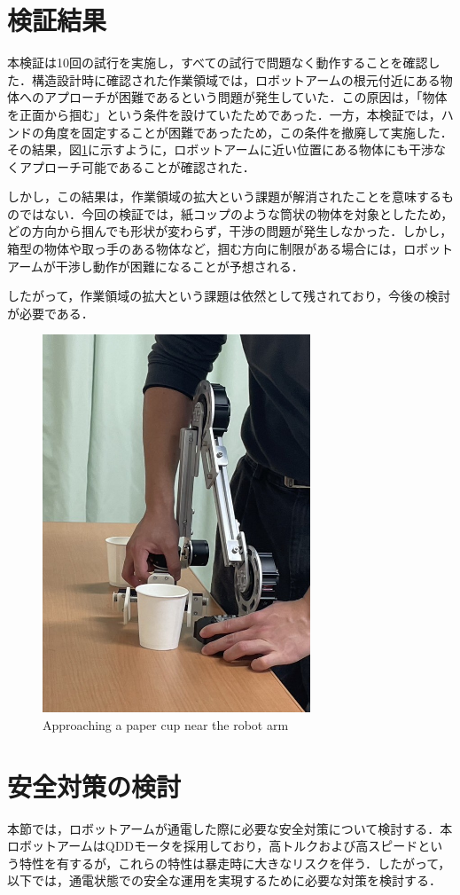 \section{検証結果}
本検証は10回の試行を実施し，すべての試行で問題なく動作することを確認した．構造設計時に確認された作業領域では，ロボットアームの根元付近にある物体へのアプローチが困難であるという問題が発生していた．この原因は，「物体を正面から掴む」という条件を設けていたためであった．一方，本検証では，ハンドの角度を固定することが困難であったため，この条件を撤廃して実施した．その結果，図\ref{fig:tikai}に示すように，ロボットアームに近い位置にある物体にも干渉なくアプローチ可能であることが確認された．

しかし，この結果は，作業領域の拡大という課題が解消されたことを意味するものではない．今回の検証では，紙コップのような筒状の物体を対象としたため，どの方向から掴んでも形状が変わらず，干渉の問題が発生しなかった．しかし，箱型の物体や取っ手のある物体など，掴む方向に制限がある場合には，ロボットアームが干渉し動作が困難になることが予想される．

したがって，作業領域の拡大という課題は依然として残されており，今後の検討が必要である．
\begin{figure}
  \centering
  \includegraphics[width=8cm]{images/kensyo/tikai.jpg}
  \caption{Approaching a paper cup near the robot arm}
  \label{fig:tikai}
\end{figure}
\newpage

\section{安全対策の検討}
本節では，ロボットアームが通電した際に必要な安全対策について検討する．本ロボットアームはQDDモータを採用しており，高トルクおよび高スピードという特性を有するが，これらの特性は暴走時に大きなリスクを伴う．したがって，以下では，通電状態での安全な運用を実現するために必要な対策を検討する．

